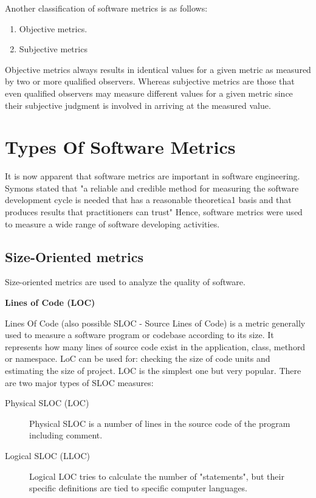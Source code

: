 Another classification of software metrics is as follows:

\begin{enumerate}
	\item Objective metrics.
	\item Subjective metrics
\end{enumerate}

Objective metrics always results in identical values for a given metric as measured by two or more qualified observers. Whereas subjective metrics are those that even qualified observers may measure different values for a given metric since their subjective judgment is involved in arriving at the measured value.

\section{Types Of Software Metrics}

It is now apparent that software metrics are important in software engineering. Symons stated that "a reliable and credible method for measuring the software development cycle is needed that has a reasonable theoretica1 basis and that produces results that practitioners can trust" Hence, software metrics were used to measure a wide range of software developing activities.

\subsection{Size-Oriented metrics}

Size-oriented metrics are used to analyze the quality of software.

\textbf{Lines of Code (LOC)}

Lines Of Code (also possible SLOC - Source Lines of Code) is a metric generally used to measure a software program or codebase according to its size. It represents how many lines of source
code exist in the application, class, methord or namespace. LoC can be used for: checking the size of code units and estimating the size of project. LOC is the simplest one but very popular.
There are two major types of SLOC measures: 

\begin{description}
	\item[Physical SLOC (LOC)] Physical SLOC is a number of lines in the source code of the program including comment.
	\item[Logical SLOC (LLOC)] Logical LOC tries to calculate the number of "statements", but their specific definitions are tied to specific computer languages.
\end{description}

